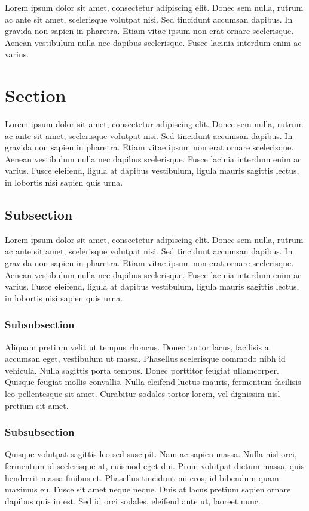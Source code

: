 \documentclass[report.tex]{subfiles}
\begin{document}
Lorem ipsum dolor sit amet, consectetur adipiscing elit.
Donec sem nulla, rutrum ac ante sit amet, scelerisque volutpat nisi.
Sed tincidunt accumsan dapibus. In gravida non sapien in pharetra. Etiam vitae ipsum non erat ornare scelerisque.
Aenean vestibulum nulla nec dapibus scelerisque. Fusce lacinia interdum enim ac varius.

\section{Section}
Lorem ipsum dolor sit amet, consectetur adipiscing elit.
Donec sem nulla, rutrum ac ante sit amet, scelerisque volutpat nisi.
Sed tincidunt accumsan dapibus. In gravida non sapien in pharetra. Etiam vitae ipsum non erat ornare scelerisque.
Aenean vestibulum nulla nec dapibus scelerisque. Fusce lacinia interdum enim ac varius.
Fusce eleifend, ligula at dapibus vestibulum, ligula mauris sagittis lectus, in lobortis nisi sapien quis urna.

\subsection{Subsection}
Lorem ipsum dolor sit amet, consectetur adipiscing elit.
Donec sem nulla, rutrum ac ante sit amet, scelerisque volutpat nisi.
Sed tincidunt accumsan dapibus. In gravida non sapien in pharetra. Etiam vitae ipsum non erat ornare scelerisque.
Aenean vestibulum nulla nec dapibus scelerisque. Fusce lacinia interdum enim ac varius.
Fusce eleifend, ligula at dapibus vestibulum, ligula mauris sagittis lectus, in lobortis nisi sapien quis urna.

\subsubsection{Subsubsection}
Aliquam pretium velit ut tempus rhoncus. Donec tortor lacus, facilisis a accumsan eget, vestibulum
ut massa. Phasellus scelerisque commodo nibh id vehicula. Nulla sagittis porta tempus.
Donec porttitor feugiat ullamcorper. Quisque feugiat mollis convallis. Nulla eleifend luctus mauris,
fermentum facilisis leo pellentesque sit amet. Curabitur sodales tortor lorem,
vel dignissim nisl pretium sit amet.

\subsubsection{Subsubsection}
Quisque volutpat sagittis leo sed suscipit. Nam ac sapien massa. Nulla nisl orci, fermentum id
scelerisque at, euismod eget dui. Proin volutpat dictum massa, quis hendrerit massa finibus et.
Phasellus tincidunt mi eros, id bibendum quam maximus eu. Fusce sit amet neque neque. Duis at lacus
pretium sapien ornare dapibus quis in est. Sed id orci sodales, eleifend ante ut, laoreet nunc.
\end{document}
